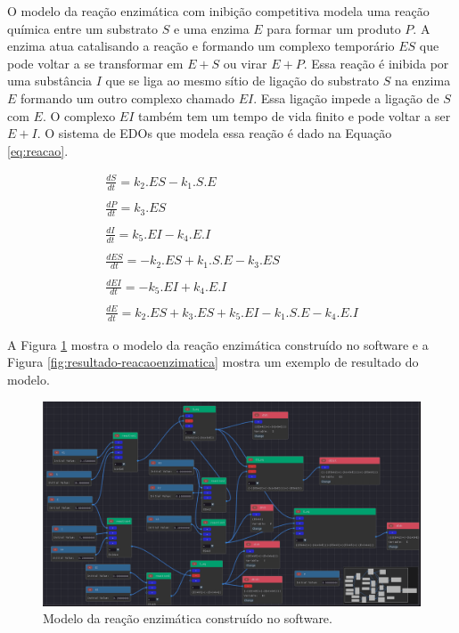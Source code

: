 \documentclass[
	12pt,				%
	openright,			%
	oneside,			%
	a4paper,			%
	main=brazil,
	english,			%
	]{ufsj-abntex2}
\begin{document}
O modelo da reação enzimática com inibição competitiva modela uma reação química entre um substrato $S$ e uma enzima $E$ para formar um produto $P$. A enzima atua catalisando a reação e formando um complexo temporário $ES$ que pode voltar a se transformar em $E + S$ ou virar $E + P$. Essa reação é inibida por uma substância $I$ que se liga ao mesmo sítio de ligação do substrato $S$ na enzima $E$ formando um outro complexo chamado $EI$. Essa ligação impede a ligação de $S$ com $E$. O complexo $EI$ também tem um tempo de vida
finito e pode voltar a ser $E + I$.  
O sistema de EDOs que modela essa reação é dado na Equação \ref{eq:reacao}.

\begin{equation}\label{eq:reacao}
    \begin{array}{lr}
        \frac{dS}{dt} = k_2.ES - k_1.S.E 
        \\
        \\
        \frac{dP}{dt} = k_3.ES
        \\
        \\ 
        \frac{dI}{dt} = k_5.EI - k_4.E.I
        \\
        \\ 
        \frac{dES}{dt} = -k_2.ES + k_1.S.E - k_3.ES
        \\
        \\ 
        \frac{dEI}{dt} = -k_5.EI + k_4.E.I
        \\
        \\ 
        \frac{dE}{dt} = k_2.ES + k_3.ES + k_5.EI - k_1.S.E - k_4.E.I
    \end{array}
\end{equation}

A Figura \ref{fig:reacaoenzimatica} mostra o modelo da reação enzimática construído no software e a Figura \ref{fig:resultado-reacaoenzimatica} mostra um exemplo de resultado do modelo.  

\begin{figure}[h]
    \centering
    \includegraphics[width=\textwidth]{imgs/modelos/reacaoenzimatica.png} 
    \caption{Modelo da reação enzimática construído no software.}
    \label{fig:reacaoenzimatica}
\end{figure}
\end{document}
